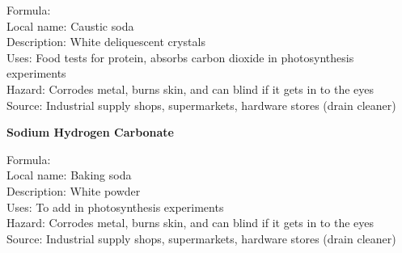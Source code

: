 \vspace{-10pt}
Formula: \\
Local name: Caustic soda\\
Description: White deliquescent crystals \\
Uses: Food tests for protein, absorbs carbon dioxide in photosynthesis experiments\\
Hazard: Corrodes metal, burns skin, and can blind if it gets in to the eyes\\
Source: Industrial supply shops, supermarkets, hardware stores (drain cleaner)\\

\begin{flushleft}
\textbf{Sodium Hydrogen Carbonate}
\end{flushleft}
\vspace{-10pt}
Formula: \\
Local name: Baking soda\\
Description: White powder \\
Uses: To add  in photosynthesis experiments\\
Hazard: Corrodes metal, burns skin, and can blind if it gets in to the eyes\\
Source: Industrial supply shops, supermarkets, hardware stores (drain cleaner)
